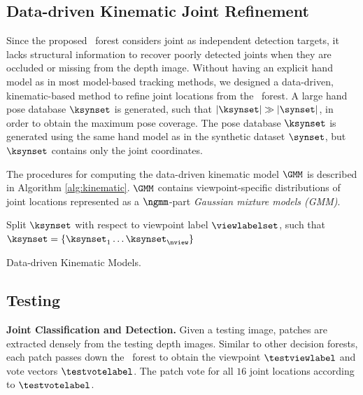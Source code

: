 \subsection{Data-driven Kinematic Joint Refinement}

Since the proposed \STR\ forest considers joint as independent detection targets, it lacks structural information to recover poorly detected joints when they are occluded or missing from the depth image. 
Without having an explicit hand model as in most model-based tracking methods, we designed a data-driven, kinematic-based method to refine joint locations from the \STR\ forest. 
A large hand pose database $\ksynset$ is generated, such that $|\ksynset| \gg |\synset|$, in order to obtain the maximum pose coverage. The pose database $\ksynset$ is generated using the same hand model as in the synthetic dataset $\synset$, but $\ksynset$ contains only the joint coordinates. 

The procedures for computing the data-driven kinematic model $\GMM$ is described in Algorithm \ref{alg:kinematic}. $\GMM$ contains viewpoint-specific distributions of joint locations represented as a $\ngmm$-part \emph{Gaussian mixture models (GMM)}. 

\begin{algorithm}
	Split $\ksynset$ with respect to viewpoint label $\viewlabelset$, such that $\ksynset = \{ \ksynset_{1} \dots \ksynset_{\nview} \}$\\
	\caption{Data-driven Kinematic Models.}
	\label{alg:kinematic}
\end{algorithm}

\subsection{Testing} 
\label{sec/hand/methodology:test}
\noindent\textbf{Joint Classification and Detection. } Given a testing image, patches are extracted densely from the testing depth images. Similar to other decision forests, each patch passes down the \STR\ forest to obtain the viewpoint $\testviewlabel$ and vote vectors $\testvotelabel$. The patch vote for all $16$ joint locations according to $\testvotelabel$.   

